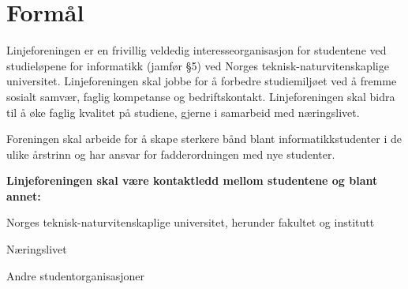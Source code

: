\chapter{Formål}

Linjeforeningen er en frivillig veldedig interesseorganisasjon for studentene ved \linebreak studieløpene for informatikk (jamfør §5) ved Norges teknisk-naturvitenskaplige \linebreak universitet. Linjeforeningen skal jobbe for å forbedre studiemiljøet ved å fremme sosialt samvær, faglig kompetanse og bedriftskontakt. Linjeforeningen skal bidra til å øke faglig kvalitet på studiene, gjerne i samarbeid med næringslivet. \newline 

Foreningen skal arbeide for å skape sterkere bånd blant informatikkstudenter i de ulike årstrinn og har ansvar for fadderordningen med nye studenter.\newline

\textbf{Linjeforeningen skal være kontaktledd mellom studentene og blant annet:}
\begin{liste}
	\item Norges teknisk-naturvitenskaplige universitet, herunder fakultet og \mbox{institutt}
	\item Næringslivet
	\item Andre studentorganisasjoner
\end{liste}
